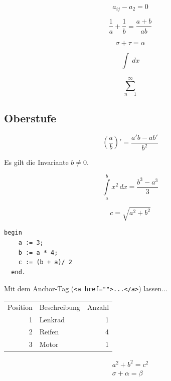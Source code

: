 \begin{equation*}
  a_{ij} - a_2 = 0
\end{equation*}

\begin{equation*}
  \frac{1}{a} + \frac{1}{b} = \frac{a+b}{ab}
\end{equation*}

\begin{equation*}
  \sigma + \tau = \alpha
\end{equation*}

\begin{equation*}
  \int_{}^{}  \,dx
\end{equation*}

\begin{equation*}
  \sum_{n = 1}^{\infty}
\end{equation*}

\subsection{Oberstufe}
\label{sec:oberstufe}

\begin{equation}
  \label{eq:1}
  \left( \frac{a}{b} \right)' = \frac{a'b-ab'}{b^{2}}
\end{equation}

Es gilt die Invariante $b \neq 0$.

\begin{equation}
  \label{eq:2}
  \int\limits_{a}^{b} x^{2} \, dx = \frac{ b^{3} - a^{3} }{3}
\end{equation}

\begin{equation}
  \label{eq:3}
  c = \sqrt{ a^{2} + b^{2} }
\end{equation}

\lstset{language=Pascal}

\begin{lstlisting}[caption=Pascal Code, label=lst:mycode]
  begin
    a := 3;
    b := a * 4;
    c := (b + a)/ 2
  end.
  \end{lstlisting}

Mit dem Anchor-Tag (\lstinline!<a href="">...</a>!) lassen...

\begin{tabular}{rlr}
  Position & Beschreibung & Anzahl \\
  1        & Lenkrad      & 1      \\
  2        & Reifen       & 4      \\
  3        & Motor        & 1      \\
\end{tabular}

\begin{equation*}\boxed{
    \begin{gathered}
      a^2 + b^2 = c^2 \\
      \sigma + \alpha = \beta
    \end{gathered}}
\end{equation*}